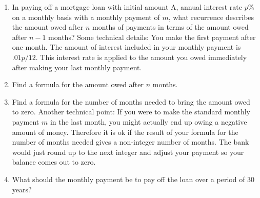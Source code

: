 \itemm
\begin{enumerate}
\item In paying off a mortgage loan with initial amount A,
annual interest rate
$p$\% on a monthly basis with a monthly payment of $m$, what recurrence
describes the amount owed after $n$ months of payments in terms of the
amount owed after $n-1$ months?  Some technical details:  You make the
first payment after one month.  The amount of interest included in your
monthly payment is $.01p/12$.  This interest rate is applied to the amount
you owed immediately after making your last monthly payment.  

\item Find a
formula for the amount owed after $n$ months.  

\item Find a formula for the
number of months needed to bring the amount owed to zero.  Another
technical point:  If you were to make the standard monthly payment $m$ in
the last month, you might actually end up owing a negative amount of
money.  Therefore it is ok if the result of your formula for the number
of months needed gives a non-integer number of months.  The bank would
just round up to the next integer and adjust your payment so your balance
comes out to zero.

\item What should the monthly payment be to pay off the loan over a period of 30
years?
\end{enumerate}

